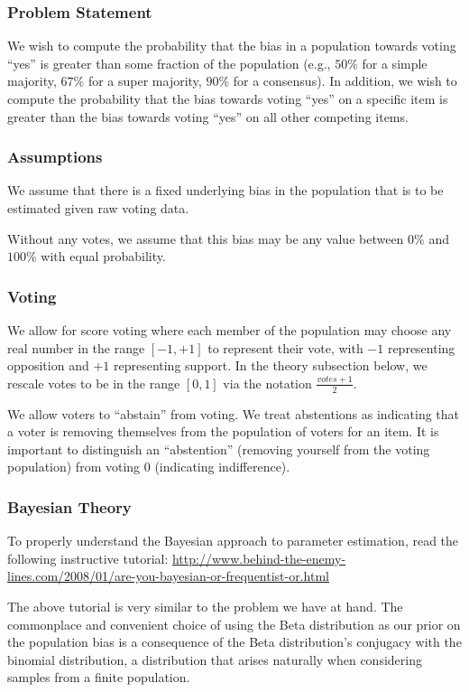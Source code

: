 \documentclass{sigchi}
\begin{document}
\subsubsection{Problem Statement}
We wish to compute the probability that the bias in a population towards voting ``yes'' is greater than some
fraction of the population (e.g., $50\%$ for a simple majority, $67\%$ for a super majority, $90\%$ for a consensus).
In addition, we wish to compute the probability that the bias towards voting ``yes'' on a specific item is greater
than the bias towards voting ``yes'' on all other competing items.

\subsubsection{Assumptions}
We assume that there is a fixed underlying bias in the population that is to be estimated given raw voting data.

Without any votes, we assume that this bias may be any value between $0\%$ and $100\%$ with equal probability.

\subsubsection{Voting}
We allow for score voting where each member of the population may choose any real number in the range $[-1,+1]$ to
represent their vote, with $-1$ representing opposition and $+1$ representing support.
In the theory subsection below, we rescale votes to be in the range $[0,1]$ via the notation $\frac{votes + 1}{2}$.

We allow voters to ``abstain'' from voting.
We treat abstentions as indicating that a voter is removing themselves from the population of voters for an item.
It is important to distinguish an ``abstention'' (removing yourself from the voting population) from voting $0$
(indicating indifference).

\subsubsection{Bayesian Theory}
To properly understand the Bayesian approach to parameter estimation, read the following instructive tutorial:
\url{http://www.behind-the-enemy-lines.com/2008/01/are-you-bayesian-or-frequentist-or.html}

The above tutorial is very similar to the problem we have at hand.
The commonplace and convenient choice of using the Beta distribution as our prior on the population bias is a
consequence of the Beta distribution's conjugacy with the binomial distribution, a distribution that arises
naturally when considering samples from a finite population.
\end{document}
